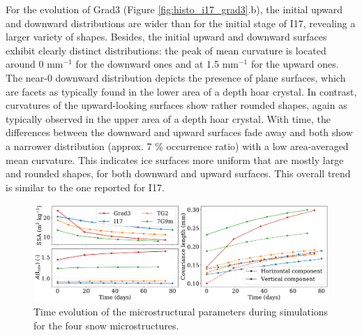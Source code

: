 \documentclass[draft,ms]{agujournal2019}
\begin{document}
For the evolution of Grad3 (Figure \ref{fig:histo_i17_grad3}.b), the initial upward and downward distributions are wider than for the initial stage of I17, revealing a larger variety of shapes. Besides, the initial upward and downward surfaces exhibit clearly distinct distributions: the peak of mean curvature is located around 0 mm$^{-1}$ for the downward ones and at 1.5 mm$^{-1}$ for the upward ones. The near-0 downward distribution depicts the presence of plane surfaces, which are facets as typically found in the lower area of a depth hoar crystal. In contrast, curvatures of the upward-looking surfaces show rather rounded shapes, again as typically observed in the upper area of a depth hoar crystal. With time, the differences between the downward and upward surfaces fade away and both show a narrower distribution (approx. 7 \% occurrence ratio) with a low area-averaged mean curvature. This indicates ice surfaces more uniform that are mostly large and rounded shapes, for both downward and upward surfaces. This overall trend is similar to the one reported for I17.\\

\begin{figure}
    \centering
    \includegraphics[width=\linewidth]{Figures/4images_microstruct_new.pdf}
    \caption{Time evolution of the microstructural parameters during simulations for the four snow microstructures.}
    \label{fig:4_images_microstruct}
\end{figure}
\end{document}
